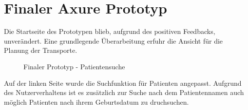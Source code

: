 \documentclass[a4paper, ngerman, 12pt]{scrartcl}
\begin{document}
\section{Finaler Axure Prototyp}
Die Startseite des Prototypen blieb, aufgrund des positiven Feedbacks, unverändert. Eine grundlegende Überarbeitung erfuhr die Ansicht für die Planung der Transporte.
\begin{figure}[h]
\centering
{}
\caption{Finaler Prototyp - Patientensuche}
\label{img:patsearch}
\end{figure}
Auf der linken Seite wurde die Suchfunktion für Patienten angepasst. Aufgrund des Nutzerverhaltens ist es zusätzlich zur Suche nach dem Patientennamen auch möglich Patienten nach ihrem Geburtsdatum zu druchsuchen.
\end{document}
